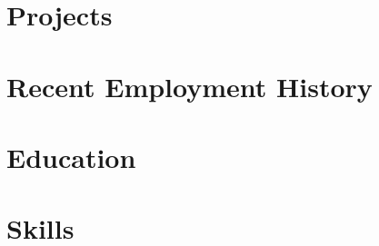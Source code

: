 \documentclass[9pt]{resume}
\begin{document}
\maketitle

\section{Projects}




\section{Recent Employment History}







\section{Education}


\section{Skills}









\end{document}

